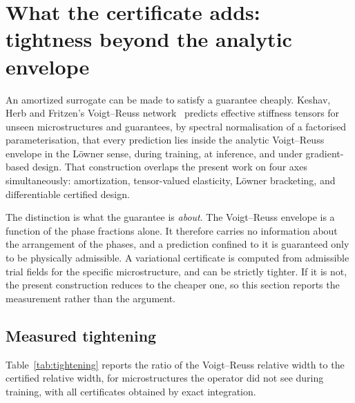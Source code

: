 
\section{What the certificate adds: tightness beyond the analytic envelope}
\label{sec:tightness}

An amortized surrogate can be made to satisfy a guarantee cheaply. Keshav,
Herb and Fritzen's Voigt--Reuss network~\cite{Keshav2025}
predicts effective stiffness tensors for unseen microstructures and
guarantees, by spectral normalisation of a factorised parameterisation,
that every prediction lies inside the analytic Voigt--Reuss envelope in the
L\"owner sense, during training, at inference, and under gradient-based
design. That construction overlaps the present work on four axes
simultaneously: amortization, tensor-valued elasticity, L\"owner
bracketing, and differentiable certified design.

The distinction is what the guarantee is \emph{about}. The Voigt--Reuss
envelope is a function of the phase fractions alone. It therefore carries
no information about the arrangement of the phases, and a prediction
confined to it is guaranteed only to be physically admissible. A
variational certificate is computed from admissible trial fields for the
specific microstructure, and can be strictly tighter. If it is not, the
present construction reduces to the cheaper one, so this section reports
the measurement rather than the argument.

\subsection{Measured tightening}
\label{sec:tightness:measured}

Table~\ref{tab:tightening} reports the ratio of the Voigt--Reuss relative
width to the certified relative width, for microstructures the operator did
not see during training, with all certificates obtained by exact
integration.

